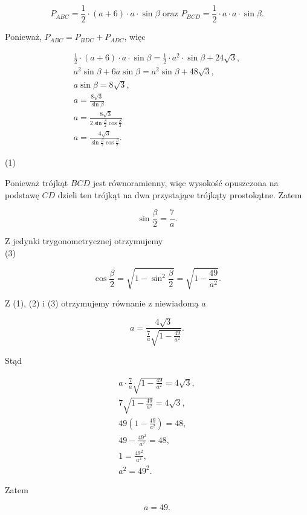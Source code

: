 \documentclass[10pt]{article}
\begin{document}
$$
P_{A B C}=\frac{1}{2} \cdot(a+6) \cdot a \cdot \sin \beta \text { oraz } P_{B C D}=\frac{1}{2} \cdot a \cdot a \cdot \sin \beta .
$$

Ponieważ, $P_{A B C}=P_{B D C}+P_{A D C}$, więc

$$
\begin{gathered}
\frac{1}{2} \cdot(a+6) \cdot a \cdot \sin \beta=\frac{1}{2} \cdot a^{2} \cdot \sin \beta+24 \sqrt{3}, \\
a^{2} \sin \beta+6 a \sin \beta=a^{2} \sin \beta+48 \sqrt{3}, \\
a \sin \beta=8 \sqrt{3}, \\
a=\frac{8 \sqrt{3}}{\sin \beta} \\
a=\frac{8 \sqrt{3}}{2 \sin \frac{\beta}{2} \cos \frac{\beta}{2}} \\
a=\frac{4 \sqrt{3}}{\sin \frac{\beta}{2} \cos \frac{\beta}{2}} .
\end{gathered}
$$

(1)

Ponieważ trójkąt $B C D$ jest równoramienny, więc wysokość opuszczona na podstawę $C D$ dzieli ten trójkąt na dwa przystające trójkąty prostokątne. Zatem


\begin{equation*}
\sin \frac{\beta}{2}=\frac{7}{a} . \tag{2}
\end{equation*}


Z jedynki trygonometrycznej otrzymujemy\\
(3)

$$
\cos \frac{\beta}{2}=\sqrt{1-\sin ^{2} \frac{\beta}{2}}=\sqrt{1-\frac{49}{a^{2}}} .
$$

Z (1), (2) i (3) otrzymujemy równanie z niewiadomą $a$

$$
a=\frac{4 \sqrt{3}}{\frac{7}{a} \sqrt{1-\frac{49}{a^{2}}}} .
$$

Stąd

$$
\begin{gathered}
a \cdot \frac{7}{a} \sqrt{1-\frac{49}{a^{2}}}=4 \sqrt{3}, \\
7 \sqrt{1-\frac{49}{a^{2}}}=4 \sqrt{3}, \\
49\left(1-\frac{49}{a^{2}}\right)=48, \\
49-\frac{49^{2}}{a^{2}}=48, \\
1=\frac{49^{2}}{a^{2}}, \\
a^{2}=49^{2} .
\end{gathered}
$$

Zatem

$$
a=49 .
$$
\end{document}
